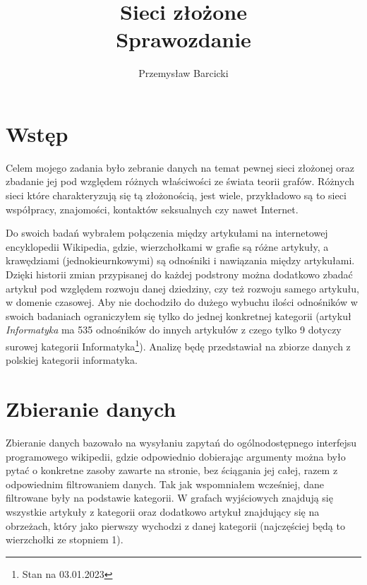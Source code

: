 \documentclass[a4paper, 12pt]{article}
\begin{document}
\title{
    \huge{Sieci złożone} \\
    \small{Sprawozdanie}
}
\author{Przemysław Barcicki}
\maketitle

\thispagestyle{empty}

\section{Wstęp}
Celem mojego zadania było zebranie danych na temat pewnej sieci złożonej oraz zbadanie jej pod względem różnych właściwości ze świata teorii grafów. Różnych sieci które charakteryzują się tą złożonością, jest wiele, przykładowo są to sieci współpracy, znajomości, kontaktów seksualnych czy nawet Internet.

Do swoich badań wybrałem połączenia między artykułami na internetowej encyklopedii Wikipedia, gdzie, wierzchołkami w grafie są różne artykuły, a krawędziami (jednokieurnkowymi) są odnośniki i nawiązania między artykułami. Dzięki historii zmian przypisanej do każdej podstrony można dodatkowo zbadać artykuł pod względem rozwoju danej dziedziny, czy też rozwoju samego artykułu, w domenie czasowej. Aby nie dochodziło do dużego wybuchu ilości odnośników w swoich badaniach ograniczyłem się tylko do jednej konkretnej kategorii (artykuł \textit{Informatyka} ma 535 odnośników do innych artykułów z czego tylko 9 dotyczy surowej kategorii Informatyka\footnote{Stan na 03.01.2023}). Analizę będę przedstawiał na zbiorze danych z polskiej kategorii informatyka.

\section{Zbieranie danych}
Zbieranie danych bazowało na wysyłaniu zapytań do ogólnodostępnego interfejsu programowego wikipedii, gdzie odpowiednio dobierając argumenty można było pytać o konkretne zasoby zawarte na stronie, bez ściągania jej całej, razem z odpowiednim filtrowaniem danych. Tak jak wspomniałem wcześniej, dane filtrowane były na podstawie kategorii. W grafach wyjściowych znajdują się wszystkie artykuły z kategorii oraz dodatkowo artykuł znajdujący się na obrzeżach, który jako pierwszy wychodzi z danej kategorii (najczęściej będą to wierzchołki ze stopniem 1).
\end{document}

